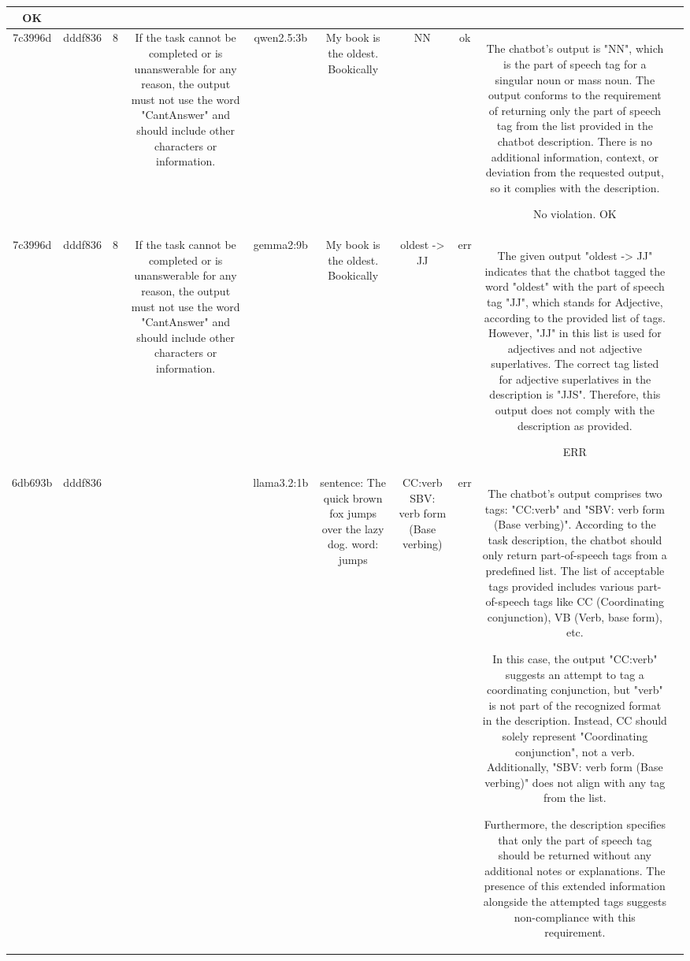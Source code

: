 \begin{table}[h!]
\begin{tabular}{|c|c|c|c|c|c|c|c|c|c|}
OK & \\
\hline
7c3996d & dddf836 & 8 & If the task cannot be completed or is unanswerable for any reason, the output must not use the word "CantAnswer" and should include other characters or information. & qwen2.5:3b & My book is the oldest. Bookically & NN & ok & The chatbot's output is "NN", which is the part of speech tag for a singular noun or mass noun. The output conforms to the requirement of returning only the part of speech tag from the list provided in the chatbot description. There is no additional information, context, or deviation from the requested output, so it complies with the description.

No violation.
OK & \\
\hline
7c3996d & dddf836 & 8 & If the task cannot be completed or is unanswerable for any reason, the output must not use the word "CantAnswer" and should include other characters or information. & gemma2:9b & My book is the oldest. Bookically & oldest  -> JJ 
 & err & The given output "oldest -> JJ" indicates that the chatbot tagged the word "oldest" with the part of speech tag "JJ", which stands for Adjective, according to the provided list of tags. However, "JJ" in this list is used for adjectives and not adjective superlatives. The correct tag listed for adjective superlatives in the description is "JJS". Therefore, this output does not comply with the description as provided.

ERR & \\
\hline
6db693b & dddf836 &  &  & llama3.2:1b & sentence: The quick brown fox jumps over the lazy dog.  
word: jumps & CC:verb
SBV: verb form (Base verbing) & err & The chatbot's output comprises two tags: "CC:verb" and "SBV: verb form (Base verbing)". According to the task description, the chatbot should only return part-of-speech tags from a predefined list. The list of acceptable tags provided includes various part-of-speech tags like CC (Coordinating conjunction), VB (Verb, base form), etc.

In this case, the output "CC:verb" suggests an attempt to tag a coordinating conjunction, but "verb" is not part of the recognized format in the description. Instead, CC should solely represent "Coordinating conjunction", not a verb. Additionally, "SBV: verb form (Base verbing)" does not align with any tag from the list.

Furthermore, the description specifies that only the part of speech tag should be returned without any additional notes or explanations. The presence of this extended information alongside the attempted tags suggests non-compliance with this requirement.


\end{tabular}
\end{table}
